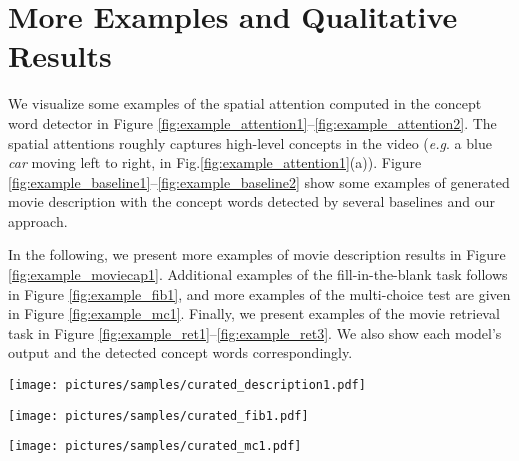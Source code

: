 \documentclass[10pt,twocolumn,letterpaper]{article}
\makeatletter
\theoremstyle{nonumberplain}
\DeclareRobustCommand\onedot{\futurelet\@let@token\@onedot}
\def\onedot{.\@\xspace}
\def\eg{\emph{e.g}\onedot} \def\Eg{\emph{E.g}\onedot}
\makeatother
\begin{document}
\section{More Examples and Qualitative Results}
\label{sec:supp_examples}


We visualize some examples of
the spatial attention computed in the concept word detector
in Figure \ref{fig:example_attention1}--\ref{fig:example_attention2}.
The spatial attentions roughly captures high-level concepts in the video
(\eg a blue \emph{car} moving left to right, in Fig.\ref{fig:example_attention1}(a)).
Figure \ref{fig:example_baseline1}--\ref{fig:example_baseline2}
show some examples of generated movie description with the concept words
detected by several baselines and our approach.

In the following,
we present more examples of movie description results in
Figure \ref{fig:example_moviecap1}.
Additional examples of the fill-in-the-blank task follows
in Figure \ref{fig:example_fib1},
and more examples of the multi-choice test are given in Figure \ref{fig:example_mc1}.
Finally, we present examples of the movie retrieval task in Figure \ref{fig:example_ret1}--\ref{fig:example_ret3}.
We also show each model's output and the detected concept words correspondingly. 




\FloatBarrier


\begin{figure*}[p]
\centering
\texttt{[image: pictures/samples/curated\_description1.pdf]}
\caption{Examples of movie descriptions. (a)-(d) are positive examples, and (e)-(f) are near-miss or wrong examples.
}
\label{fig:example_moviecap1}
\vspace{-5pt}
\end{figure*}



\begin{figure*}[p]
\centering
\texttt{[image: pictures/samples/curated\_fib1.pdf]}
\caption{Examples of fill-in-the-blank task. (a)-(d) are positive examples, and (e)-(f) are near-miss or wrong examples.
}
\label{fig:example_fib1}
\vspace{-5pt}
\end{figure*}

\begin{figure*}[p]
\centering
\texttt{[image: pictures/samples/curated\_mc1.pdf]}
\caption{Examples of multiple-choice test.
    The groundtruth answer is in bold, and the output of our model is marked with a red checkbox.
    (a)-(c) are positive examples, and (d) is a near-miss or wrong example.
}
\label{fig:example_mc1}
\vspace{-5pt}
\end{figure*}
\end{document}
